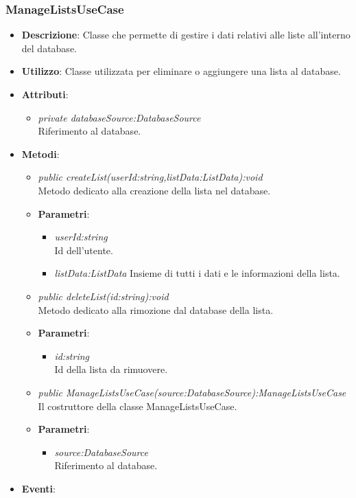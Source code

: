 \subsubsection{ManageListsUseCase}
\begin{itemize}
\item \textbf{Descrizione}: Classe che permette di gestire i dati relativi alle liste all'interno del database.
\item \textbf{Utilizzo}: Classe utilizzata per eliminare o aggiungere una lista al database.
\item \textbf{Attributi}: 
	\begin{itemize}
	\item \textit{private databaseSource:DatabaseSource}\\
		Riferimento al database.
	\end{itemize}
\item \textbf{Metodi}:
	\begin{itemize}
	\item \textit{public createList(userId:string,listData:ListData):void}\\
		Metodo dedicato alla creazione della lista nel database.
			\item{\textbf{Parametri}: \begin{itemize}
			\item \textit{userId:string}\\
			Id dell'utente.
			\item \textit{listData:ListData}
			Insieme di tutti i dati e le informazioni della lista.
			\end{itemize}}
	\item \textit{public deleteList(id:string):void}\\
	Metodo dedicato alla rimozione dal database della lista.
			\item{\textbf{Parametri}: \begin{itemize}
			\item \textit{id:string}\\
			Id della lista da rimuovere.
			\end{itemize}}
	\item \textit{public ManageListsUseCase(source:DatabaseSource):ManageListsUseCase}\\
	Il costruttore della classe ManageListsUseCase.
		\item{\textbf{Parametri}: \begin{itemize}
			\item \textit{source:DatabaseSource}\\
						Riferimento al database.
			\end{itemize}}
	\end{itemize}
\item \textbf{Eventi}:
\end{itemize}

